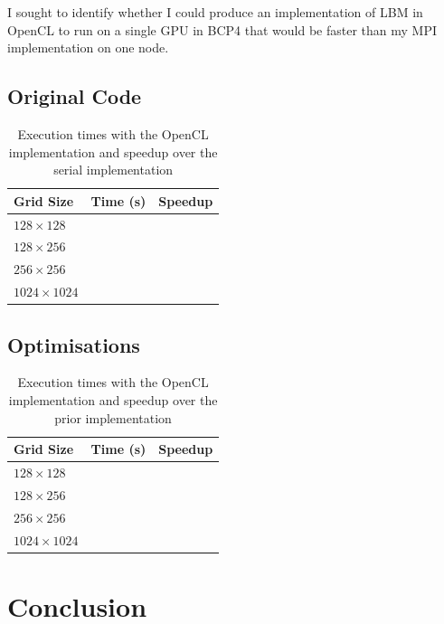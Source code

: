 \documentclass[twocolumn, a4paper]{article}
\begin{document}
I sought to identify whether I could produce an implementation of LBM in OpenCL to run on a single GPU in BCP4 that would be faster than my MPI implementation on one node.

\subsection{Original Code}

\begin{table}[htbp]
  \begin{center}
  \caption{Execution times with the OpenCL implementation and speedup over the serial implementation}\label{tab:OpenCL_1}
  \begin{tabular}[t]{l | l l} 
      \hline\hline
      Grid Size&Time (s)&Speedup\\
      \hline
      $128 \times 128$&\texttt{}&\texttt{}\\
      $128 \times 256$&\texttt{}&\texttt{}\\
      $256 \times 256$&\texttt{}&\texttt{}\\
      $1024 \times 1024$&\texttt{}&\texttt{}\\
      \hline
    \end{tabular}
  \end{center}
\end{table}

\subsection{Optimisations}

\begin{table}[htbp]
  \begin{center}
  \caption{Execution times with the OpenCL implementation and speedup over the prior implementation}\label{tab:OpenCL_2}
  \begin{tabular}[t]{l | l l} 
      \hline\hline
      Grid Size&Time (s)&Speedup\\
      \hline
      $128 \times 128$&\texttt{}&\texttt{}\\
      $128 \times 256$&\texttt{}&\texttt{}\\
      $256 \times 256$&\texttt{}&\texttt{}\\
      $1024 \times 1024$&\texttt{}&\texttt{}\\
      \hline
    \end{tabular}
  \end{center}
\end{table}

\section{Conclusion}

\printbibliography
\end{document}
